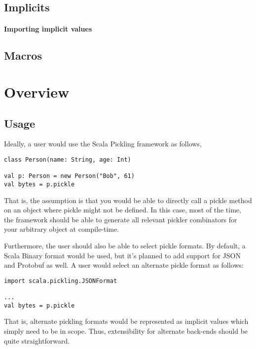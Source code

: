 \documentclass[preprint,10pt]{sigplanconf}
\begin{document}
\subsection{Implicits}

\paragraph{Importing implicit values}

\subsection{Macros}

\section{Overview}

\subsection{Usage}

Ideally, a user would use the Scala Pickling framework as follows,

\begin{verbatim}
class Person(name: String, age: Int)

val p: Person = new Person("Bob", 61)
val bytes = p.pickle
\end{verbatim}\noindent

That is, the assumption is that you would be able to directly call a
pickle method on an object where pickle might not be defined. In this
case, most of the time, the framework should be able to generate all
relevant pickler combinators for your arbitrary object at
compile-time.

Furthermore, the user should also be able to select pickle formats. By
default, a Scala Binary format would be used, but it's planned to add
support for JSON and Protobuf as well. A user would select an
alternate pickle format as follows:

\begin{verbatim}
import scala.pickling.JSONFormat

...
val bytes = p.pickle
\end{verbatim}\noindent

That is, alternate pickling formats would be represented as implicit
values which simply need to be in scope. Thus, extensibility for
alternate back-ends should be quite straightforward.
\end{document}
